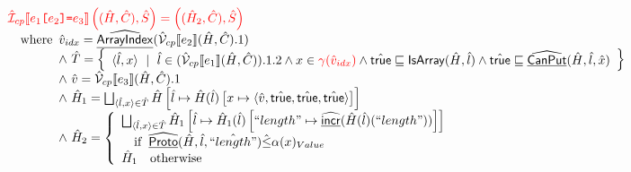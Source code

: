 \documentclass{article}
\newcommand{\SF}[1]{\mbox{\textsf{#1}}}
\newcommand{\TT}[1]{\mbox{\texttt{#1}}}
\newcommand{\wherec}[1]{{\rm where}\begin{array}[t]{l}#1\end{array}}
\newcommand{\ifc}[1]{{\rm if}\begin{array}[t]{l}#1\end{array}}
\newcommand{\owc}{{\rm otherwise}}
\newcommand{\aI}{\hat{\mathcal{I}}}
\newcommand{\aV}{\hat{\mathcal{V}}}
\newcommand{\set}[1]{\left\{\begin{array}{l}#1\end{array}\right\}}
\newcommand{\lbr}{\llbracket}
\newcommand{\rbr}{\rrbracket}
\newcommand{\ahf}[1]{\widehat{\underline{\sf #1}}}
\newcommand{\atrue}{\hat{\SF{true}}}
\newcommand{\afalse}{\hat{\SF{false}}}
\def\inred{\color{red}}
\begin{document}
\[\begin{array}{ll}
\inred \aI_{cp}\lbr e_1\TT{[}e_2\TT{]}\TT{=}e_3 \rbr \left((\hat{H},\hat{C}),\hat{S}\right)
 = \left((\hat{H}_2,\hat{C}),\hat{S}\right) \\
\quad\wherec{
  \hat{v}_{idx}=\ahf{ArrayIndex}(\aV_{cp}\lbr e_2\rbr(\hat{H},\hat{C}).1) \\
  \land\ \hat{T}=\set{\langle\hat{l}, x\rangle~\mid~\hat{l}\in(\aV_{cp}\lbr e_1\rbr(\hat{H},\hat{C})).1.2
    \land x\in{\inred \gamma(\hat{v}_{idx})}\land \atrue\sqsubseteq\SF{IsArray}(\hat{H},\hat{l})
    \land \atrue\sqsubseteq\ahf{CanPut}(\hat{H},\hat{l},\hat{x})
  } \\
  \land\ \hat{v}=\aV_{cp}\lbr e_3\rbr(\hat{H},\hat{C}).1 \\
  \land\ \hat{H}_1 = \bigsqcup_{\langle\hat{l},x\rangle\in\hat{T}}\hat{H}\left[\hat{l}\mapsto\hat{H}(\hat{l})\left[x\mapsto\langle\hat{v},\atrue,\atrue,\atrue\rangle\right]\right] \\
  \land\ \hat{H}_2 = \left\{
    \begin{array}{ll}
      \bigsqcup_{\langle\hat{l},x\rangle\in\hat{T}}\hat{H}_1\left[\hat{l}\mapsto\hat{H}_1(\hat{l})\left[``length"\mapsto \ahf{incr}(\hat{H}(\hat{l})(``length"))\right]\right]\\ \quad\ifc{\ahf{Proto}(\hat{H},\hat{l}, \hat{``length"})\hat{\le} \alpha(x)_{Value}} \\
      \hat{H}_1 \quad\owc
    \end{array}
    \right.
}\\\\

\end{array}
\]
\end{document}
